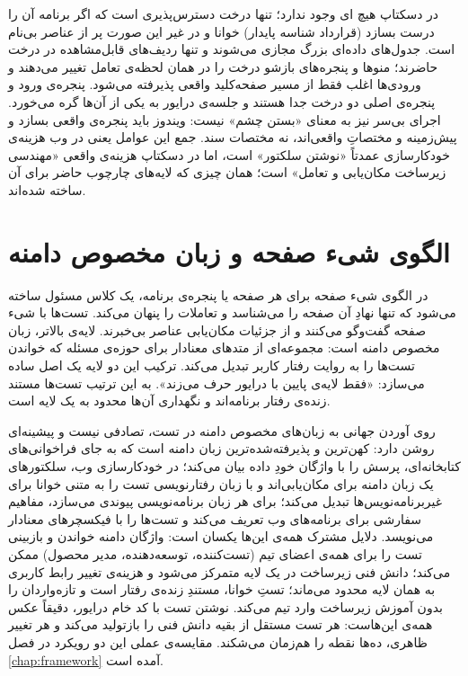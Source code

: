 در دسکتاپ هیچ
ای وجود ندارد؛ تنها درخت دسترس‌پذیری است که اگر برنامه آن را درست بسازد (قرارداد شناسه پایدار) خوانا و در غیر این صورت پر از عناصر بی‌نام است. جدول‌های داده‌ای بزرگ مجازی می‌شوند و تنها ردیف‌های قابل‌مشاهده در درخت حاضرند؛ منوها و پنجره‌های بازشو درخت را در همان لحظه‌ی تعامل تغییر می‌دهند و ورودی‌ها اغلب فقط از مسیر صفحه‌کلید واقعی پذیرفته می‌شود. پنجره‌ی ورود و پنجره‌ی اصلی دو درخت جدا هستند و جلسه‌ی درایور به یکی از آن‌ها گره می‌خورد. اجرای بی‌سر نیز به معنای «بستن چشم» نیست: ویندوز باید پنجره‌ی واقعی بسازد و پیش‌زمینه و مختصاتِ واقعی‌اند، نه مختصات سند. جمع این عوامل یعنی در وب هزینه‌ی خودکارسازی عمدتاً «نوشتن سلکتور» است، اما در دسکتاپ هزینه‌ی واقعی «مهندسی زیرساخت مکان‌یابی و تعامل» است؛ همان چیزی که لایه‌های چارچوب حاضر برای آن ساخته شده‌اند.

\section{الگوی شیء صفحه و زبان مخصوص دامنه}
در الگوی شیء صفحه
\cite{fowler2002}
برای هر صفحه یا پنجره‌ی برنامه، یک کلاس مسئول ساخته می‌شود که تنها نهادِ آن صفحه را می‌شناسد و تعاملات را پنهان می‌کند. تست‌ها با شیء صفحه گفت‌وگو می‌کنند و از جزئیات مکان‌یابی عناصر بی‌خبرند. لایه‌ی بالاتر، زبان مخصوص دامنه
است: مجموعه‌ای از متدهای معنادار برای حوزه‌ی مسئله که خواندن تست‌ها را به روایت رفتار کاربر تبدیل می‌کند. ترکیب این دو لایه یک اصل ساده می‌سازد: «فقط لایه‌ی پایین با درایور حرف می‌زند». به این ترتیب تست‌ها مستند زنده‌ی رفتار برنامه‌اند و نگهداری آن‌ها محدود به یک لایه است.

روی آوردن جهانی به زبان‌های مخصوص دامنه در تست، تصادفی نیست و پیشینه‌ای روشن دارد:
کهن‌ترین و پذیرفته‌شده‌ترین زبان دامنه است که به جای فراخوانی‌های کتابخانه‌ای، پرسش را با واژگان خودِ داده بیان می‌کند؛ در خودکارسازی وب، سلکتورهای
یک زبان دامنه برای مکان‌یابی‌اند و
\cite{crispin2009}
با زبان رفتارنویسی
تست را به متنی خوانا برای غیربرنامه‌نویس‌ها تبدیل می‌کند؛
برای هر زبان برنامه‌نویسی پیوندی می‌سازد،
مفاهیم سفارشی برای برنامه‌های وب تعریف می‌کند و
تست‌ها را با فیکسچرهای معنادار می‌نویسد. دلایل مشترک همه‌ی این‌ها یکسان است: واژگان دامنه خواندن و بازبینی تست را برای همه‌ی اعضای تیم (تست‌کننده، توسعه‌دهنده، مدیر محصول) ممکن می‌کند؛ دانش فنی زیرساخت در یک لایه متمرکز می‌شود و هزینه‌ی تغییر رابط کاربری به همان لایه محدود می‌ماند؛ تستِ خوانا، مستندِ زنده‌ی رفتار است و تازه‌واردان را بدون آموزش زیرساخت وارد تیم می‌کند. نوشتن تست با کد خام درایور، دقیقاً عکس همه‌ی این‌هاست: هر تست مستقل از بقیه دانش فنی را بازتولید می‌کند و هر تغییر ظاهری، ده‌ها نقطه را هم‌زمان می‌شکند. مقایسه‌ی عملی این دو رویکرد در فصل
\autoref{chap:framework}
آمده است.

